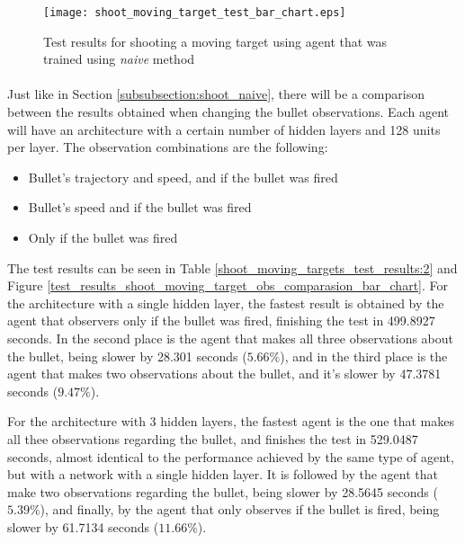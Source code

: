 \begin{figure}
    \begin{center}
        \texttt{[image: shoot\_moving\_target\_test\_bar\_chart.eps]}
        \caption{Test results for shooting a moving target using agent that was trained using \emph{naive} method}
        \label{test_results_shoot_moving_target_bar_chart}
    \end{center}
\end{figure}



\paragraph{}
Just like in Section \ref{subsubsection:shoot_naive}, there will be a comparison between the results obtained when changing the bullet observations. Each agent will have an architecture with a certain number of hidden layers and 128 units per layer. The observation combinations are the following:
\begin{itemize}
    \item Bullet's trajectory and speed, and if the bullet was fired
    \item Bullet's speed and if the bullet was fired
    \item Only if the bullet was fired
\end{itemize}

The test results can be seen in Table \ref{shoot_moving_targets_test_results:2} and Figure \ref{test_results_shoot_moving_target_obs_comparasion_bar_chart}. For the architecture with a single hidden layer, the fastest result is obtained by the agent that observers only if the bullet was fired, finishing the test in 499.8927 seconds. In the second place is the agent that makes all three observations about the bullet, being slower by 28.301 seconds ($5.66\%$), and in the third place is the agent that makes two observations about the bullet, and it's slower by 47.3781 seconds ($9.47\%$).

For the architecture with 3 hidden layers, the fastest agent is the one that makes all thee observations regarding the bullet, and finishes the test in 529.0487 seconds, almost identical to the performance achieved by the same type of agent, but with a network with a single hidden layer. It is followed by the agent that make two observations regarding the bullet, being slower by 28.5645 seconds ($5.39\%$), and finally, by the agent that only observes if the bullet is fired, being slower by 61.7134 seconds ($11.66\%$).

